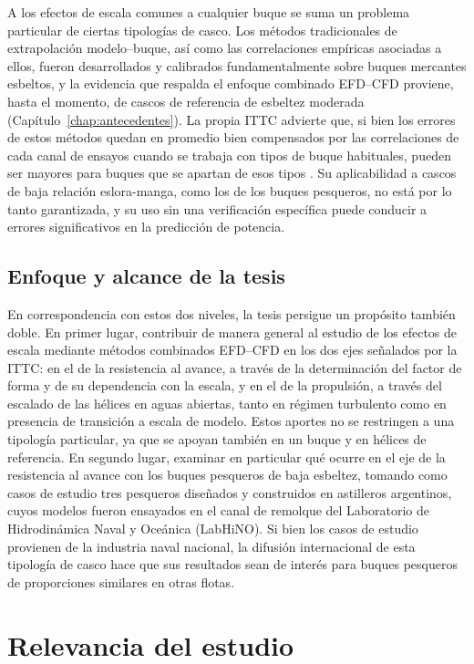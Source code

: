 A los efectos de escala comunes a cualquier buque se suma un problema
particular de ciertas tipologías de casco. Los métodos tradicionales de
extrapolación modelo--buque, así como las correlaciones empíricas asociadas
a ellos, fueron desarrollados y calibrados fundamentalmente sobre buques
mercantes esbeltos, y la evidencia que respalda el enfoque combinado EFD--CFD
proviene, hasta el momento, de cascos de referencia de esbeltez moderada
(Capítulo~\ref{chap:antecedentes}). La propia ITTC advierte que, si bien los
errores de estos métodos quedan en promedio bien compensados por las
correlaciones de cada canal de ensayos cuando se trabaja con tipos de buque
habituales, pueden ser mayores para buques que se apartan de esos tipos
\citep{ITTC_Combined_2021}. Su aplicabilidad a cascos de baja relación
eslora-manga, como los de los buques pesqueros, no está por lo tanto
garantizada, y su uso sin una verificación específica puede conducir a
errores significativos en la predicción de potencia.

\subsection{Enfoque y alcance de la tesis}

En correspondencia con estos dos niveles, la tesis persigue un propósito
también doble. En primer lugar, contribuir de manera general al estudio de los
efectos de escala mediante métodos combinados EFD--CFD en los dos ejes
señalados por la ITTC: en el de la resistencia al avance, a través de la
determinación del factor de forma y de su dependencia con la escala, y en el
de la propulsión, a través del escalado de las hélices en aguas abiertas,
tanto en régimen turbulento como en presencia de transición a escala de
modelo. Estos aportes no se restringen a una tipología particular, ya que se
apoyan también en un buque y en hélices de referencia. En segundo lugar,
examinar en particular qué ocurre en el eje de la resistencia al avance con
los buques pesqueros de baja esbeltez, tomando como casos de estudio tres
pesqueros diseñados y construidos en astilleros argentinos, cuyos modelos
fueron ensayados en el canal de remolque del Laboratorio de Hidrodinámica
Naval y Oceánica (LabHiNO). Si bien los casos de
estudio provienen de la industria naval nacional, la difusión internacional de esta tipología de casco hace que sus resultados
sean de interés para buques pesqueros de proporciones similares en otras
flotas.

\section{Relevancia del estudio}

